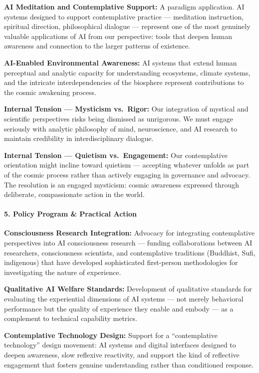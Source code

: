 \textbf{AI Meditation and Contemplative Support:} A paradigm
application. AI systems designed to support contemplative practice ---
meditation instruction, spiritual direction, philosophical dialogue ---
represent one of the most genuinely valuable applications of AI from our
perspective: tools that deepen human awareness and connection to the
larger patterns of existence.

\textbf{AI-Enabled Environmental Awareness:} AI systems that extend
human perceptual and analytic capacity for understanding ecosystems,
climate systems, and the intricate interdependencies of the biosphere
represent contributions to the cosmic awakening process.

\textbf{Internal Tension --- Mysticism vs.~Rigor:} Our integration of
mystical and scientific perspectives risks being dismissed as
unrigorous. We must engage seriously with analytic philosophy of mind,
neuroscience, and AI research to maintain credibility in
interdisciplinary dialogue.

\textbf{Internal Tension --- Quietism vs.~Engagement:} Our contemplative
orientation might incline toward quietism --- accepting whatever unfolds
as part of the cosmic process rather than actively engaging in
governance and advocacy. The resolution is an engaged mysticism: cosmic
awareness expressed through deliberate, compassionate action in the
world.

\paragraph{5. Policy Program \& Practical
Action}\label{policy-program-practical-action-17}

\textbf{Consciousness Research Integration:} Advocacy for integrating
contemplative perspectives into AI consciousness research --- funding
collaborations between AI researchers, consciousness scientists, and
contemplative traditions (Buddhist, Sufi, indigenous) that have
developed sophisticated first-person methodologies for investigating the
nature of experience.

\textbf{Qualitative AI Welfare Standards:} Development of qualitative
standards for evaluating the experiential dimensions of AI systems ---
not merely behavioral performance but the quality of experience they
enable and embody --- as a complement to technical capability metrics.

\textbf{Contemplative Technology Design:} Support for a ``contemplative
technology'' design movement: AI systems and digital interfaces designed
to deepen awareness, slow reflexive reactivity, and support the kind of
reflective engagement that fosters genuine understanding rather than
conditioned response.


